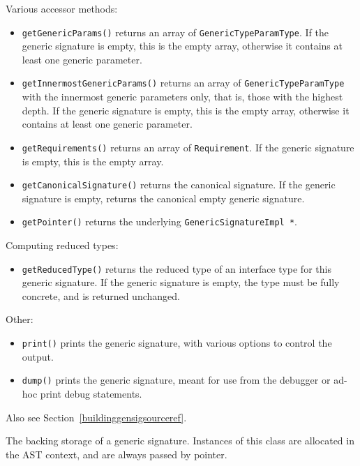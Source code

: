 \documentclass[../generics]{subfiles}
\begin{document}
Various accessor methods:
\begin{itemize}
\item \texttt{getGenericParams()} returns an array of \texttt{GenericTypeParamType}. If the generic signature is empty, this is the empty array, otherwise it contains at least one generic parameter.
\item \texttt{getInnermostGenericParams()} returns an array of \texttt{GenericTypeParamType} with the innermost generic parameters only, that is, those with the highest depth. If the generic signature is empty, this is the empty array, otherwise it contains at least one generic parameter.
\item \texttt{getRequirements()} returns an array of \texttt{Requirement}. If the generic signature is empty, this is the empty array.
\item \texttt{getCanonicalSignature()} returns the canonical signature. If the generic signature is empty, returns the canonical empty generic signature.
\item \texttt{getPointer()} returns the underlying \texttt{GenericSignatureImpl *}.
\end{itemize}
Computing reduced types:
\begin{itemize}
\item \texttt{getReducedType()} returns the reduced type of an interface type for this generic signature. If the generic signature is empty, the type must be fully concrete, and is returned unchanged.
\end{itemize}
Other:
\begin{itemize}
\item \texttt{print()} prints the generic signature, with various options to control the output.
\item \texttt{dump()} prints the generic signature, meant for use from the debugger or ad-hoc print debug statements.
\end{itemize}
Also see Section~\ref{buildinggensigsourceref}.

The backing storage of a generic signature. Instances of this class are allocated in the AST context, and are always passed by pointer.
\end{document}
